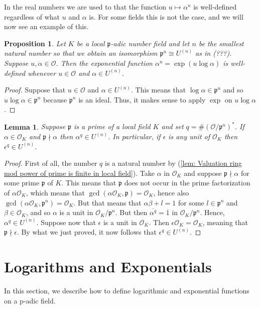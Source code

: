\documentclass{article}
\newtheorem{proposition}{Proposition}[section]
\newtheorem{lemma}{Lemma}[section]
\newcommand{\mfrak}[1]{\mathfrak{#1}}
\newcommand{\mcal}[1]{\mathcal{#1}}
\begin{document}
In the real numbers we are used to that the function $u \mapsto \alpha^u$ is well-defined regardless of what $u$ and $\alpha$ is. For some fields this is not the case, and we will now see an example of this. 

\begin{proposition}
    Let $K$ be a local $\mfrak p$-adic number field and let $n$ be the smallest natural number so that we obtain an isomorphism $\mfrak p^n \cong U^{(n)}$ as in (???). Suppose $u,\alpha \in \mcal O$. Then the exponential function $\alpha^u = \exp(u \log \alpha)$ is well-defined whenever $u \in \mcal O$ and $\alpha \in U^{(n)}$.
\end{proposition}
\begin{proof}
    Suppose that $u \in \mcal O$ and $\alpha \in U^{(n)}$. This means that $\log \alpha \in \mfrak p^n$ and so $u \log \alpha \in \mfrak p^n$ because $\mfrak p^n$ is an ideal. Thus, it makes sense to apply $\exp$ on $u \log \alpha$.
\end{proof}

\begin{lemma}
    Suppose $\mfrak p$ is a prime of a local field $K$ and set $q = \# (\mcal O / \mfrak p^n)^*$. If $\alpha \in \mcal O_K$ and $\mfrak p \nmid \alpha$ then $\alpha^q \in U^{(n)}$. In particular, if $\epsilon$ is any unit of $\mcal O_K$ then $\epsilon^q \in U^{(n)}$.
\end{lemma}
\begin{proof}
    First of all, the number $q$ is a natural number by (\ref{lem: Valuation ring mod power of prime is finite in local field}). Take $\alpha$ in $\mcal O_K$ and suppose $\mfrak p \nmid \alpha$ for some prime $\mfrak p$ of $K$. This means that $\mfrak p$ does not occur in the prime factorization of $\alpha \mcal O_K$, which means that $\gcd(\alpha \mcal O_K, \mfrak p) = \mcal O_K$, hence also $\gcd(\alpha \mcal O_K, \mfrak p^n) = \mcal O_K$. But that means that $\alpha \beta + l = 1$ for some $l \in \mfrak p^n$ and $\beta \in \mcal O_K$, and so $\alpha$ is a unit in $\mcal O_K / \mfrak p^n$. But then $\overline{\alpha^q} = \overline 1$ in $\mcal O_K / \mfrak p^n$. Hence, $\alpha^q \in U^{(n)}$. Suppose now that $\epsilon$ is a unit in $\mcal O_K$. Then $\epsilon \mcal O_K = \mcal O_K$, meaning that $\mfrak p \nmid \epsilon$. By what we just proved, it now follows that $\epsilon^q \in U^{(n)}$. 
\end{proof}



\section{Logarithms and Exponentials}
In this section, we describe how to define logarithmic and exponential functions on a p-adic field. 
\end{document}
